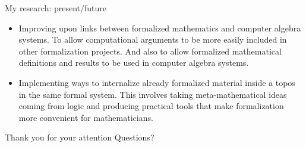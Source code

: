 \documentclass{beamer}
\theoremstyle{plain}
\begin{document}
\begin{frame}{My research: present/future}
    \begin{itemize}
        \item Improving upon links between formalized mathematics and computer algebra systems. To allow computational arguments to be more easily included
              in other formalization projects. And also to allow formalized mathematical definitions and results to be used in computer algebra systems.
        \item Implementing ways to internalize already formalized material inside a topos in the same formal system. This involves taking meta-mathematical ideas coming from logic and producing practical tools that make formalization more convenient for mathematicians.
    \end{itemize}
\end{frame}
\begin{frame}{Thank you for your attention}
    Questions?
\end{frame}

\begin{frame}
\end{frame}

\newcommand{\comment}[2]{#2}
\end{document}
